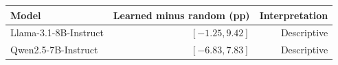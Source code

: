 \begin{tabular}{lrr}
\toprule
Model & Learned minus random (pp) & Interpretation \\
\midrule
Llama-3.1-8B-Instruct & $[-1.25,9.42]$ & Descriptive \\
Qwen2.5-7B-Instruct & $[-6.83,7.83]$ & Descriptive \\
\bottomrule
\end{tabular}
